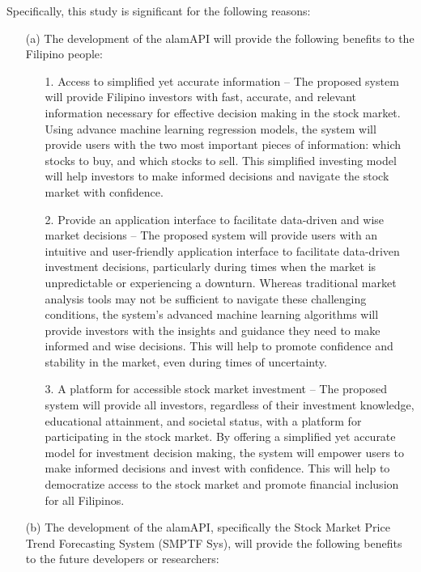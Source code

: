 Specifically, this study is significant for the following reasons:
\begin{itemize}
  \item[(a)] The development of the alamAPI will provide the 
  following benefits to the Filipino people:
  \begin{itemize}
    \item[1.]	Access to simplified yet accurate information 
    – The proposed system will provide Filipino investors with fast, 
    accurate, and relevant information necessary for effective decision making 
    in the stock market. Using advance machine learning regression models, the system 
    will provide users with the two most important pieces of information: 
    which stocks to buy, and which stocks to sell. This simplified investing 
    model will help investors to make informed decisions and navigate the stock 
    market with confidence.
    \item[2.]	Provide an application interface to facilitate data-driven 
    and wise market decisions – The proposed system will provide users with 
    an intuitive and user-friendly application interface to facilitate data-driven 
    investment decisions, particularly during times when the market is unpredictable 
    or experiencing a downturn. Whereas traditional market analysis tools may not 
    be sufficient to navigate these challenging conditions, the system's advanced 
    machine learning algorithms will provide investors with the insights and guidance 
    they need to make informed and wise decisions. This will help to promote 
    confidence and stability in the market, even during times of uncertainty.
    \item[3.]	A platform for accessible stock market investment – 
    The proposed system will provide all investors, regardless of their 
    investment knowledge, educational attainment, and societal status, 
    with a platform for participating in the stock market. By offering a 
    simplified yet accurate model for investment decision making, the 
    system will empower users to make informed decisions and invest with confidence. 
    This will help to democratize access to the stock market and promote financial 
    inclusion for all Filipinos.
  \end{itemize}
  \item[(b)] The development of the alamAPI, specifically the Stock Market Price 
  Trend Forecasting System (SMPTF Sys), will provide the following benefits 
  to the future developers or researchers:
  \begin{itemize}

\end{itemize}
\end{itemize}

